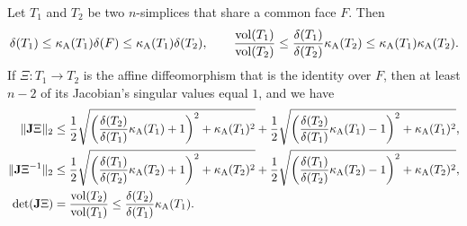 \documentclass[10pt,a4paper]{article}
\begin{document}
\begin{lemma}\label{lemma:volumecomparison}
    Let $T_1$ and $T_2$ be two $n$-simplices that share a common face $F$. Then 
    \begin{align*}
        {\delta}(T_1)
        \leq 
        \kappa_{\rm A}(T_1)
        {\delta}(F)
        \leq 
        \kappa_{\rm A}(T_1)
        {\delta}(T_2)
        ,
        \qquad 
        \frac{ \operatorname{vol}(T_1) }{ \operatorname{vol}(T_2) }
        \leq 
        \frac{ {\delta}(T_1) }{ {\delta}(T_2) } \kappa_{\rm A}(T_2)
        \leq 
        \kappa_{\rm A}(T_1) \kappa_{\rm A}(T_2)
        .
    \end{align*}
    If $\Xi : T_1 \rightarrow T_2$ is the affine diffeomorphism that is the identity over $F$, then 
    at least $n-2$ of its Jacobian's singular values equal $1$, and we have 
    \begin{align*}
        \|  {\mathbf{J}} \Xi^{  }  \|_{2} 
        &
        \leq 
        \frac{1}{2} 
        \sqrt{ \left( \frac{ {\delta}(T_2) }{ {\delta}(T_1) } \kappa_{\rm A}(T_{1}) + 1 \right)^{2} + \kappa_{\rm A}(T_{1})^{2} }
        +
        \frac{1}{2} 
        \sqrt{ \left( \frac{ {\delta}(T_2) }{ {\delta}(T_1) } \kappa_{\rm A}(T_{1}) - 1 \right)^{2} + \kappa_{\rm A}(T_{1})^{2} }
        ,
        \\
        \|  {\mathbf{J}} \Xi^{-1}  \|_{2} 
        &
        \leq 
        \frac{1}{2} 
        \sqrt{ \left( \frac{ {\delta}(T_1) }{ {\delta}(T_2) } \kappa_{\rm A}(T_{2}) + 1 \right)^{2} + \kappa_{\rm A}(T_{2})^{2} }
        +
        \frac{1}{2} 
        \sqrt{ \left( \frac{ {\delta}(T_1) }{ {\delta}(T_2) } \kappa_{\rm A}(T_{2}) - 1 \right)^{2} + \kappa_{\rm A}(T_{2})^{2} }
        ,
        \\
        \det({\mathbf{J}} \Xi)
        &
        =
        \frac{ \operatorname{vol}(T_2) }{ \operatorname{vol}(T_1) }
        \leq 
        \frac{ {\delta}(T_2) }{ {\delta}(T_1) } \kappa_{\rm A}(T_1)
        .
    \end{align*}
\end{lemma}
\end{document}
